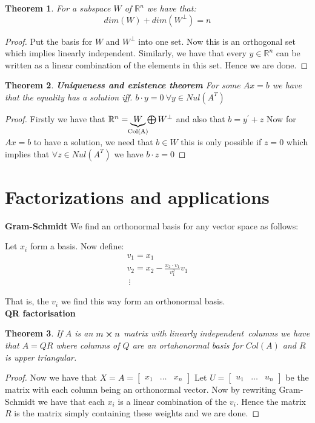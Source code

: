 \documentclass[titlepage]{article}
\newtheorem{thm}{Theorem}[subsection]
\numberwithin{equation}{subsection}
\newcommand{\Rn}{\mathbb{R}^n}
\newcommand{\li}{linearly independent}
\begin{document}
\begin{thm}
For a subspace $W$ of $\Rn$ we have that:
$$dim(W) + dim(W^{\perp}) = n$$
\end{thm}

\begin{proof}
Put the basis for $W$ and $W^{\perp}$ into one set. Now this is an orthogonal set which implies \li. Similarly, we have that every $y \in \Rn$ can be written as a linear combination of the elements in this set. Hence we are done.
\end{proof}

\begin{thm}\textbf{Uniqueness and existence theorem}
For some $Ax=b$ we have that the equality has a solution iff. $b\cdot y = 0 \ \forall y \in Nul(A^{T})$
\end{thm}

\begin{proof}
Firstly we have that $\Rn = \underbrace{W}_{\text{\makebox[0pt]{Col(A)}}} \bigoplus W^{\perp}$ and also that $b = y^{'} + z$ Now for $Ax=b$ to have a solution, we need that $b \in W$ this is only possible if $z = 0$ which implies that $\forall z \in Nul(A^{T})$ we have $b \cdot z = 0$ 
\end{proof}


\clearpage
\section{Factorizations and applications}
\begin{tcolorbox}\textbf{Gram-Schmidt}
We find an orthonormal basis for any vector space as follows:

Let $x_{i}$ form a basis. Now define:
\begin{align*}
    v_{1} = x_{1}\\
    v_{2} = x_{2} - \frac{x_{2}\cdot v_{1}}{v_{1}^2}v_{1}\\
    \ \vdots
\end{align*}

That is, the $v_{i}$ we find this way form an orthonormal basis. 
\\

\textbf{QR factorisation}
\begin{thm}
If $A$ is an $m\cross n$ matrix with \li \ columns we have that $A = QR$ where columns of $Q$ are an ortahonormal basis for $Col(A)$ and $R$ is upper triangular. 
\end{thm}

\begin{proof}
Now we have that $X =  A = \begin{bmatrix}
    x_{1} & \hdots & x_{n}
\end{bmatrix}$ Let $U = \begin{bmatrix}
    u_{1} & \hdots & u_{n}
\end{bmatrix}$ be the matrix with each column being an orthonormal vector.  Now by rewriting Gram-Schmidt we have that each $x_{i}$ is a linear combination of the $v_{i}$. Hence the matrix $R$ is the matrix simply containing these weights and we are done. 
\end{proof}
\end{tcolorbox}
\end{document}
